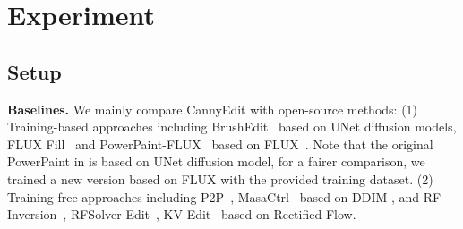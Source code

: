 \documentclass{article}
\begin{document}








\section{Experiment}
\label{Sec:experiment}


\subsection{Setup}

\textbf{Baselines.} We mainly compare CannyEdit with open-source methods: (1) Training-based approaches including BrushEdit~\cite{li2024brushedit} based on UNet diffusion models, FLUX Fill~\cite{blackforest2024FLUX} and PowerPaint-FLUX~\cite{zhuang2023task} based on FLUX~\cite{blackforest2024FLUX}. Note that the original PowerPaint in \cite{blackforest2024FLUX} is based on UNet diffusion model, for a fairer comparison, we trained a new version based on FLUX with the provided training dataset. (2) Training-free approaches including P2P~\cite{hertz2022prompt}, MasaCtrl~\cite{cao2023masactrl} based on DDIM \citep{song2022denoisingdiffusionimplicitmodels}, and RF-Inversion~\cite{rout2024semantic}, RFSolver-Edit~\cite{wang2024taming}, KV-Edit~\cite{zhu2025kv} based on Rectified
Flow. %
\end{document}
